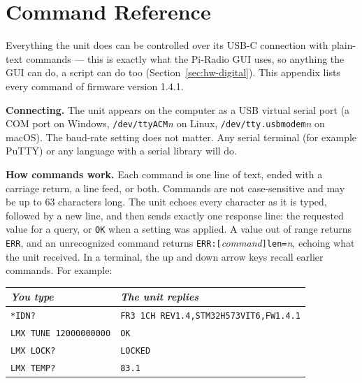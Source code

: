 \clearpage
\section{Command Reference}
\label{sec:commands}
\raggedbottom%

Everything the unit does can be controlled over its USB-C connection with plain-text commands --- this is exactly
what the Pi-Radio GUI uses, so anything the GUI can do, a script can do too (Section~\ref{sec:hw-digital}). This
appendix lists every command of firmware version 1.4.1.

\textbf{Connecting.} The unit appears on the computer as a USB virtual serial port (a COM port on Windows,
\texttt{/dev/ttyACM}\textit{n} on Linux, \texttt{/dev/tty.usbmodem}\textit{n} on macOS). The baud-rate setting
does not matter. Any serial terminal (for example PuTTY) or any language with a serial library will do.

\textbf{How commands work.} Each command is one line of text, ended with a carriage return, a line feed, or both.
Commands are not case-sensitive and may be up to 63 characters long. The unit echoes every character as it is
typed, followed by a new line, and then sends exactly one response line: the requested value for a query, or
\texttt{OK} when a setting was applied. A value out of range returns \texttt{ERR}, and an unrecognized command
returns \texttt{ERR:[}\textit{command}\texttt{]len=}\textit{n}, echoing what the unit received. In a terminal, the
up and down arrow keys recall earlier commands. For example:
\par\medskip\noindent\begin{minipage}{\linewidth}%
\begin{center}
\label{tab:cmd-example}
\vspace{0.4em}
\footnotesize
\begin{tabular}{ll}
\textit{You type} & \textit{The unit replies} \\
\hline
\texttt{*IDN?} & \texttt{FR3 1CH REV1.4,STM32H573VIT6,FW1.4.1} \\
\texttt{LMX TUNE 12000000000} & \texttt{OK} \\
\texttt{LMX LOCK?} & \texttt{LOCKED} \\
\texttt{LMX TEMP?} & \texttt{83.1} \\
\end{tabular}
\end{center}
\end{minipage}\par

